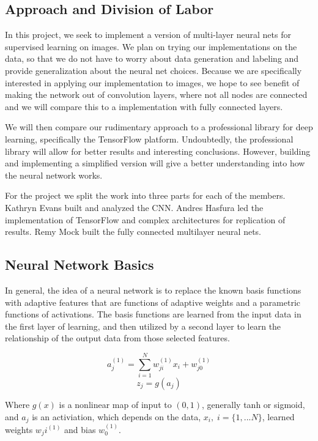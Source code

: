 \documentclass[12pt, twocolumn]{article}
\begin{document}
\subsection{Approach and Division of Labor}
	
In this project, we seek to implement a version of multi-layer neural nets for supervised learning on images. We plan on trying our implementations on the data, so that we do not have to worry about data generation and labeling and provide generalization about the neural net choices. Because we are specifically interested in applying our implementation to images, we hope to see benefit of making the network out of convolution layers, where not all nodes are connected and we will compare this to a implementation with fully connected layers.

 We will then compare our rudimentary approach to a professional library for deep learning, specifically the TensorFlow platform. Undoubtedly, the professional library will allow for better results and interesting conclusions. However, building and implementing a simplified version will give a better understanding into how the neural network works. 
 
 For the project we split the work into three parts for each of the members. Kathryn Evans built and analyzed the CNN. Andres Hasfura led the implementation of TensorFlow and complex architectures for replication of results. Remy Mock built the fully connected multilayer neural nets. 

\subsection{Neural Network Basics}

In general, the idea of a neural network is to replace the known basis functions with adaptive features that are functions of adaptive weights and a parametric functions of activations. The basis functions are learned from the input data in the first layer of learning, and then utilized by a second layer to learn the relationship of the output data from those selected features.

\begin{equation}
a_j^{(1)}= \sum_{i=1}^N w_{ji}^{(1)} x_i+w_{j0}^{(1)}
\end{equation}
\begin{equation}
z_j= g(a_j)
\end{equation}

Where $g(x)$ is a nonlinear map of input to $(0,1)$, generally tanh or sigmoid, and $a_j$ is an activiation, which depends on the data, $x_i, \; i=\{1,...N\}$, learned weights $w_ji^{(1)}$ and bias $w_0^{(1)}$. 
\end{document}
